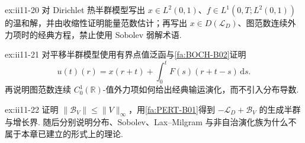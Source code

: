 \begin{FAExercise}[受迫热半群]{ex:ii11-20}
对 Dirichlet 热半群模型写出 \(\displaystyle x\in L^2(0,1)\)、\(\displaystyle f\in L^1(0,T;L^2(0,1))\) 的温和解，并由收缩性证明能量范数估计；再写出 \(\displaystyle x\in D(\mathcal L_D)\)、图范数连续外力项时的经典方程，禁止使用 Sobolev 弱解术语.
\end{FAExercise}

\begin{FAExercise}[受迫平移公式]{ex:ii11-21}
对平移半群模型使用有界点值泛函与\autoref{fa:BOCH-B02}证明
\[
u(t)(r)=x(r+t)+\int_0^tF(s)(r+t-s)\,\mathrm{d}s.
\]
再说明图范数连续 \(\displaystyle C_0^1(\mathbb R)\)-值外力项如何给出经典输运演化，而不引入分布导数.
\end{FAExercise}

\begin{FAExercise}[有界势与后续理论边界]{ex:ii11-22}
证明 \(\displaystyle\|\mathcal B_V\|\leqslant\|V\|_\infty\)，用\autoref{fa:PERT-B01}得到 \(\displaystyle-\mathcal L_D+\mathcal B_V\) 的生成半群与增长界. 随后分别说明分布、Sobolev、Lax--Milgram 与非自治演化族为什么不属于本章已建立的形式上的理论.
\end{FAExercise}
